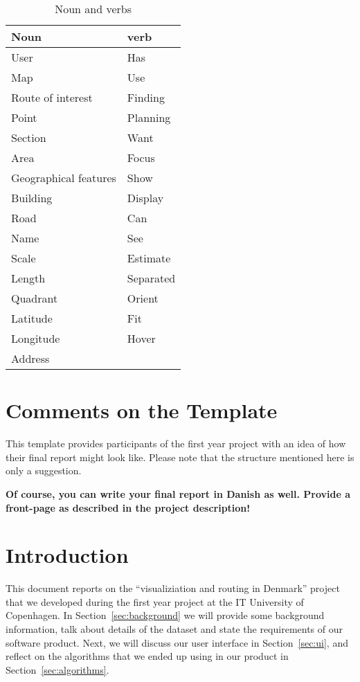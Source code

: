 \documentclass[11pt]{article}
\begin{document}
\begin{table*}[ht]
\caption{Noun and verbs}
\centering
\begin{tabular}{|l|l|}
\hline
Noun & verb\\
\hline
User & Has\\
Map & Use\\
Route of interest & Finding\\
Point & Planning\\
Section & Want\\
Area & Focus\\
Geographical features & Show\\
Building & Display\\
Road & Can\\
Name & See\\
Scale & Estimate\\
Length & Separated\\
Quadrant & Orient\\
Latitude & Fit\\
Longitude & Hover\\
Address & \\


\hline
\end{tabular}
\end{table*}


\section*{Comments on the Template}
This template provides participants of the first year project with
an idea of how their final report might look like. Please note that the structure
mentioned here is only a suggestion.

\textbf{Of course, you can write your final report in Danish as well. Provide a front-page as described in the project description!}

\section{Introduction} This document reports on the
``visualiziation and routing in Denmark'' project that we developed during the first year project at the IT University of Copenhagen.
In Section~\ref{sec:background} we will provide some background information, talk about details of the dataset and state the requirements of our software product. Next, we will discuss our user interface in Section~\ref{sec:ui}, and reflect on the algorithms that we ended up using in our product in Section~\ref{sec:algorithms}.
\end{document}
